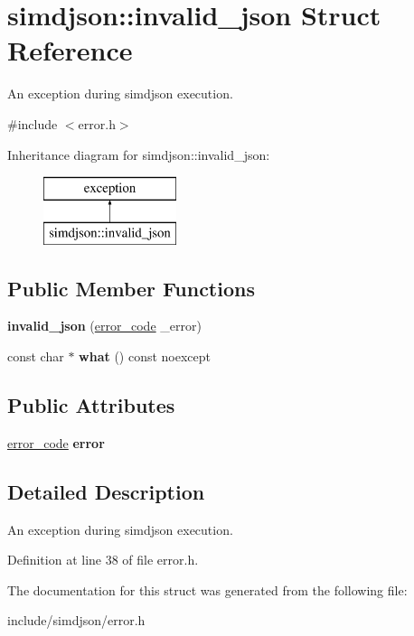 \hypertarget{structsimdjson_1_1invalid__json}{}\section{simdjson\+:\+:invalid\+\_\+json Struct Reference}
\label{structsimdjson_1_1invalid__json}


An exception during simdjson execution.  




{\ttfamily \#include $<$error.\+h$>$}

Inheritance diagram for simdjson\+:\+:invalid\+\_\+json\+:\begin{figure}[H]
\begin{center}
\leavevmode
\includegraphics[height=2.000000cm]{structsimdjson_1_1invalid__json}
\end{center}
\end{figure}
\subsection*{Public Member Functions}
\begin{DoxyCompactItemize}
\item 
\mbox{\label{structsimdjson_1_1invalid__json_a73610360ef5d59c4649db523df630667}} 
{\bfseries invalid\+\_\+json} (\hyperlink{namespacesimdjson_a7b735a3a50ba79e3f7f14df5f77d8da9}{error\+\_\+code} \+\_\+error)
\item 
\mbox{\label{structsimdjson_1_1invalid__json_a87689a3b8e2e23f6e23a498d0db51392}} 
const char $\ast$ {\bfseries what} () const noexcept
\end{DoxyCompactItemize}
\subsection*{Public Attributes}
\begin{DoxyCompactItemize}
\item 
\mbox{\label{structsimdjson_1_1invalid__json_a06299213e2add462c0fdc7224e21bbe1}} 
\hyperlink{namespacesimdjson_a7b735a3a50ba79e3f7f14df5f77d8da9}{error\+\_\+code} {\bfseries error}
\end{DoxyCompactItemize}


\subsection{Detailed Description}
An exception during simdjson execution. 



Definition at line 38 of file error.\+h.



The documentation for this struct was generated from the following file\+:\begin{DoxyCompactItemize}
\item 
include/simdjson/error.\+h\end{DoxyCompactItemize}
